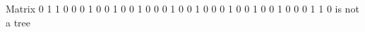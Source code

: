 \documentclass{article}
\begin{document}
Matrix
0 1 1 0 0 0
1 0 0 1 0 0
1 0 0 0 1 0
0 1 0 0 0 1
0 0 1 0 0 1
0 0 0 1 1 0
is not a tree
\end{document}
